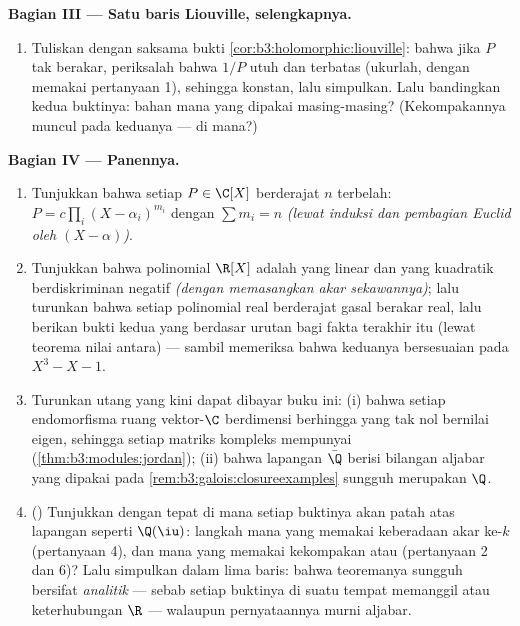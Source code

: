 \begin{problem}
\medskip
\noindent\textbf{Bagian III --- Satu baris Liouville,
selengkapnya.}
\begin{enumerate}[resume]
  \item Tuliskan dengan saksama bukti
        \cref{cor:b3:holomorphic:liouville}: bahwa jika $P$ tak
        berakar, periksalah bahwa $1/P$ utuh dan terbatas (ukurlah,
        dengan memakai pertanyaan 1), sehingga konstan, lalu simpulkan.
        Lalu bandingkan kedua buktinya: bahan mana yang dipakai masing-masing?
        (Kekompakannya muncul pada keduanya --- di mana?)
\end{enumerate}

\medskip
\noindent\textbf{Bagian IV --- Panennya.}
\begin{enumerate}[resume]
  \item Tunjukkan bahwa setiap $P \in \C[X]$ berderajat $n$ terbelah:
        $P = c\prod_{i}(X - \alpha_i)^{m_i}$ dengan $\sum m_i =
        n$ \emph{(lewat induksi dan pembagian Euclid oleh $(X -
        \alpha)$)}.
  \item Tunjukkan bahwa polinomial  $\R[X]$ adalah
        yang linear dan yang kuadratik berdiskriminan negatif
        \emph{(dengan memasangkan akar sekawannya)}; lalu turunkan
        bahwa setiap polinomial real berderajat gasal berakar real,
        lalu berikan bukti kedua yang berdasar urutan bagi
        fakta terakhir itu (lewat teorema nilai antara) ---
        sambil memeriksa bahwa keduanya bersesuaian pada $X^3 - X - 1$.
  \item Turunkan utang yang kini dapat dibayar buku ini: (i) bahwa setiap
        endomorfisma ruang vektor-$\C$ berdimensi berhingga
        yang tak nol bernilai eigen, sehingga setiap matriks
        kompleks mempunyai 
        (\cref{thm:b3:modules:jordan}); (ii) bahwa lapangan
        $\bar\Q$ berisi bilangan aljabar yang dipakai pada
        \cref{rem:b3:galois:closureexamples} sungguh merupakan  $\Q$.
  \item () Tunjukkan dengan tepat di mana setiap buktinya akan patah atas
        lapangan seperti $\Q(\iu)$: langkah mana yang memakai keberadaan
        akar ke-$k$ (pertanyaan 4), dan mana yang memakai kekompakan
        atau  (pertanyaan 2 dan 6)? Lalu simpulkan dalam lima
        baris: bahwa teoremanya sungguh bersifat \emph{analitik} ---
        sebab setiap buktinya di suatu tempat memanggil  atau
        keterhubungan $\R$ --- walaupun pernyataannya
        murni aljabar.
\end{enumerate}


\end{problem}
